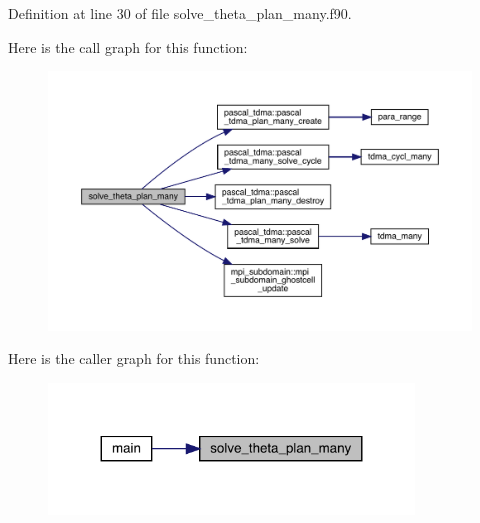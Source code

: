 Definition at line 30 of file solve\+\_\+theta\+\_\+plan\+\_\+many.\+f90.

Here is the call graph for this function\+:
\nopagebreak
\begin{figure}[H]
\begin{center}
\leavevmode
\includegraphics[width=350pt]{solve__theta__plan__many_8f90_af048018fcdfbe66e00922dee3e7e9a64_cgraph}
\end{center}
\end{figure}
Here is the caller graph for this function\+:
\nopagebreak
\begin{figure}[H]
\begin{center}
\leavevmode
\includegraphics[width=275pt]{solve__theta__plan__many_8f90_af048018fcdfbe66e00922dee3e7e9a64_icgraph}
\end{center}
\end{figure}
